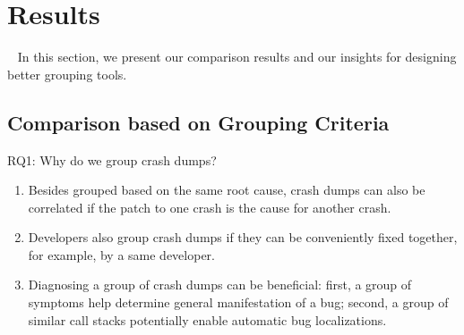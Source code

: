 \section{Results}~\label{sec:results}
In this section, we present our comparison results and our insights for designing better grouping tools.

\subsection{Comparison based on Grouping Criteria}
RQ1: Why do we group crash dumps?
\begin{enumerate}
\item Besides grouped based on the same root cause, crash dumps can also be correlated if the patch to one crash is the cause for another crash.
\item Developers also group crash dumps if they can be conveniently fixed together, for example, by a same developer.
\item Diagnosing a group of crash dumps can be beneficial: first, a group of symptoms help determine general manifestation of a bug; second, a group of similar call stacks potentially enable automatic bug localizations. 
\end{enumerate}

\begin{table}[!htb]
\centering
\caption{Grouping Criteria for m-Groups\label{tab:goal}}
\end{table}

